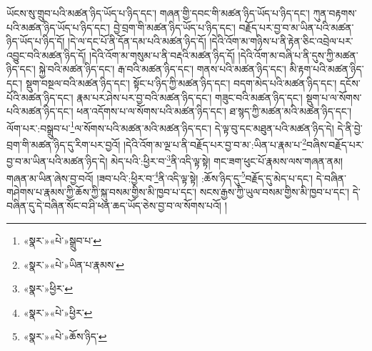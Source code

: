 ཡོངས་སུ་གྲུབ་པའི་མཚན་ཉིད་ཡོད་པ་ཉིད་དང་། གཞན་གྱི་དབང་གི་མཚན་ཉིད་ཡོད་པ་ཉིད་དང་། ཀུན་བརྟགས་པའི་མཚན་ཉིད་ཡོད་པ་ཉིད་དང་། བྱེ་བྲག་གི་མཚན་ཉིད་ཡོད་པ་ཉིད་དང་། བརྗོད་པར་བྱ་བ་མ་ཡིན་པའི་མཚན་ཉིད་ཡོད་པ་ཉིད་དོ། །དེ་ལ་དང་པོ་ནི་དོན་དམ་པའི་མཚན་ཉིད་དོ། །དེའི་འོག་མ་གཉིས་པ་ནི་རྟེན་ཅིང་འབྲེལ་པར་འབྱུང་བའི་མཚན་ཉིད་དོ། །དེའི་འོག་མ་གསུམ་པ་ནི་བརྡའི་མཚན་ཉིད་དོ། །དེའི་འོག་མ་བཞི་པ་ནི་དུས་ཀྱི་མཚན་ཉིད་དང་། སྐྱེ་བའི་མཚན་ཉིད་དང་། རྒ་བའི་མཚན་ཉིད་དང་། གནས་པའི་མཚན་ཉིད་དང་། མི་རྟག་པའི་མཚན་ཉིད་དང་། སྡུག་བསྔལ་བའི་མཚན་ཉིད་དང་། སྟོང་པ་ཉིད་ཀྱི་མཚན་ཉིད་དང་། བདག་མེད་པའི་མཚན་ཉིད་དང་། དངོས་པོའི་མཚན་ཉིད་དང་། རྣམ་པར་ཤེས་པར་བྱ་བའི་མཚན་ཉིད་དང་། གཟུང་བའི་མཚན་ཉིད་དང་། སྡུག་པ་ལ་སོགས་པའི་མཚན་ཉིད་དང་། ཕན་འདོགས་པ་ལ་སོགས་པའི་མཚན་ཉིད་དང་། ཐ་སྙད་ཀྱི་མཚན་མའི་མཚན་ཉིད་དང་། ལོག་པར་:བསྒྲུབ་པ་\footnote{«སྣར་»«པེ་»སྒྲུབ་པ་}ལ་སོགས་པའི་མཚན་མའི་མཚན་ཉིད་དང་། དེ་ལྟ་བུ་དང་མཐུན་པའི་མཚན་ཉིད་དེ། དེ་ནི་བྱེ་བྲག་གི་མཚན་ཉིད་དུ་རིག་པར་བྱའོ། །དེའི་འོག་མ་ལྔ་པ་ནི་བརྗོད་པར་བྱ་བ་མ་:ཡིན་པ་རྣམ་པ་\footnote{«སྣར་»«པེ་»ཡིན་པ་རྣམས་}བཞིས་བརྗོད་པར་བྱ་བ་མ་ཡིན་པའི་མཚན་ཉིད་དེ། མེད་པའི་:ཕྱིར་བ་\footnote{«སྣར་»ཕྱིར་}ནི་འདི་ལྟ་སྟེ། གང་ཟག་ཕུང་པོ་རྣམས་ལས་གཞན་ནམ། གཞན་མ་ཡིན་ཞེས་བྱ་བའོ། །ཟབ་པའི་:ཕྱིར་བ་\footnote{«སྣར་»«པེ་»ཕྱིར་}ནི་འདི་ལྟ་སྟེ། :ཆོས་ཉིད་དུ་\footnote{«སྣར་»«པེ་»ཆོས་ཉིད་}བརྗོད་དུ་མེད་པ་དང་། དེ་བཞིན་གཤེགས་པ་རྣམས་ཀྱི་ཆོས་ཀྱི་སྐུ་བསམ་གྱིས་མི་ཁྱབ་པ་དང་། སངས་རྒྱས་ཀྱི་ཡུལ་བསམ་གྱིས་མི་ཁྱབ་པ་དང་། དེ་བཞིན་དུ་དེ་བཞིན་སོང་བ་ཤི་ཕན་ཆད་ཡོད་ཅེས་བྱ་བ་ལ་སོགས་པའོ། །
